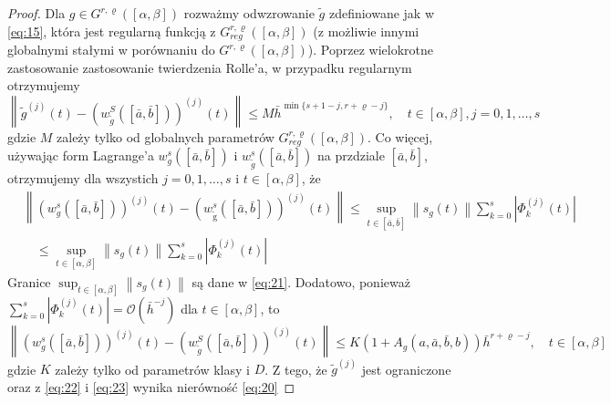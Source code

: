 \documentclass[oik, pdftex, robocza, man]{mgrwms}
\begin{document}
\begin{proof}
        Dla $g \in G^{r, \varrho}([\alpha, \beta])$ rozważmy odwzrowanie $\tilde{g}$ zdefiniowane jak w \eqref{eq:15}, która jest regularną funkcją z $G_{reg}^{r, \varrho}([\alpha, \beta])$ (z możliwie innymi globalnymi stałymi w porównaniu do $G^{r, \varrho}([\alpha, \beta])$). Poprzez wielokrotne zastosowanie zastosowanie twierdzenia Rolle'a, w przypadku regularnym otrzymujemy
        \begin{equation} \label{eq:21}
            \left\|\tilde{g}^{(j)}(t)-\left(w_{\tilde{g}}^{S}([\bar{a}, \bar{b}])\right)^{(j)}(t)\right\| \leq M \bar{h}^{\min \{s+1-j, r+\varrho-j\}}, \quad t \in[\alpha, \beta], j=0,1, \ldots, s
        \end{equation}
        gdzie $M$ zależy tylko od globalnych parametrów $G_{reg}^{r, \varrho}([\alpha, \beta])$. Co więcej, używając form Lagrange'a $w_{g}^{s}([\bar{a}, \bar{b}])$ i $w_{\tilde{g}}^{s}([\bar{a}, \bar{b}])$ na przdziale $[\bar{a}, \bar{b}]$, otrzymujemy dla wszystich $j=0,1, \ldots, s$ i $t \in[\alpha, \beta]$, że
        \begin{equation*}
            \begin{aligned}
                &\left\|\left(w_{g}^{s}([\bar{a}, \bar{b}])\right)^{(j)}(t)-\left(w_{\tilde{\mathrm{g}}}^{s}([\bar{a}, \bar{b}])\right)^{(j)}(t)\right\| \leq \sup _{t \in[\bar{a}, \bar{b}]}\left\|s_{g}(t)\right\| \sum_{k=0}^{s}\left|\Phi_{k}^{(j)}(t)\right| \\
                &\quad \leq \sup _{t \in[\alpha, \beta]}\left\|s_{g}(t)\right\| \sum_{k=0}^{s}\left|\Phi_{k}^{(j)}(t)\right|
                \end{aligned}
        \end{equation*}
        Granice $\sup _{t \in[\alpha, \beta]}\left\|s_{g}(t)\right\|$ są dane w \eqref{eq:21}. 
        Dodatowo, ponieważ $\sum_{k=0}^{s}\left|\Phi_{k}^{(j)}(t)\right|=\mathcal{O}\left(\bar{h}^{-j}\right)$ dla $t \in[\alpha, \beta]$, to
        \begin{equation} \label{eq:23}
            \left\|\left(w_{g}^{s}([\bar{a}, \bar{b}])\right)^{(j)}(t)-\left(w_{\tilde{g}}^{S}([\bar{a}, \bar{b}])\right)^{(j)}(t)\right\| \leq K\left(1+A_{g}(a, \bar{a}, \bar{b}, b)\right) \bar{h}^{r+\varrho-j}, \quad t \in[\alpha, \beta]            
        \end{equation}
        gdzie $K$ zależy tylko od parametrów klasy i $D$. Z tego, że $\tilde{g}^{(j)}$ jest ograniczone oraz z \eqref{eq:22} i \eqref{eq:23} wynika nierówność \eqref{eq:20}
    \end{proof}
\end{document}
